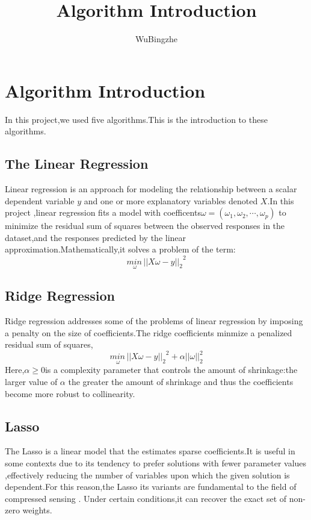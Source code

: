 \documentclass[10pt,a4paper]{ctexart}
\author{WuBingzhe}
\title{Algorithm Introduction}
\begin{document}
    \maketitle
    \section{Algorithm Introduction}
    In this project,we used five algorithms.This is the introduction
    to these algorithms.
    \subsection{The Linear Regression}
    Linear regression is an approach for modeling the relationship between
    a scalar dependent variable $y$ and one or more explanatory variables denoted
    $X$.In this project ,linear regression fits a model with coefficents$\omega = (\omega_1,\omega_2,\cdots,\omega_p)$
    to minimize the residual sum of squares between the observed responses in the dataset,and the responses predicted
    by the linear approximation.Mathematically,it solves a problem of the term:
    \begin{equation}
        \underset{\omega}{min\,}{||X\omega-y||_2}^2
    \end{equation}
    \subsection{Ridge Regression}
    Ridge regression addresses some of the problems of linear regression by imposing a
    penalty on the size of coefficients.The ridge coefficients minmize a penalized residual sum of 
    squares,
    \begin{equation*}
    	\underset{\omega}{min\,}{||X\omega-y||_2}^2+\alpha||\omega||_2^2
    \end{equation*} 
    Here,$\alpha \geq 0$is a complexity parameter that controls the amount of shrinkage:the larger value of $\alpha$
    the greater the amount of shrinkage and thus the coefficients become more robust to collinearity.
    \subsection{Lasso}
    The Lasso is a linear model that the estimates sparse coefficients.It
    is useful in some contexts due to its tendency to prefer solutions with
    fewer parameter values ,effectively reducing the number of variables upon which the given solution is dependent.For this reason,the Lasso
    its variants are fundamental to the field of compressed sensing .
    Under certain conditions,it can recover the exact set of non-zero 
    weights.
    
\end{document}
